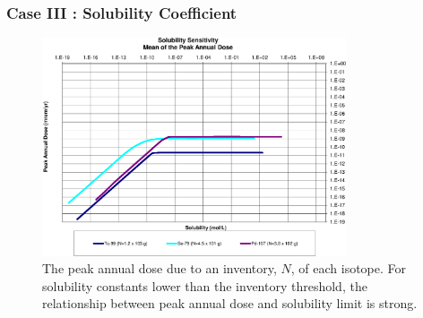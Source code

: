 \begin{frame}[c]
  \frametitle{Case III : Solubility Coefficient}

\begin{figure}[ht]
\centering
\includegraphics[width=0.8\textwidth]{Solubility/Solubility_Summary_Sol.eps}
\caption{
The peak annual dose due to an inventory, $N$, of each isotope.
For solubility constants lower than the inventory threshold, the relationship between peak 
annual dose and solubility limit is strong.}
\label{fig:SolSum}
\end{figure}
\end{frame}

